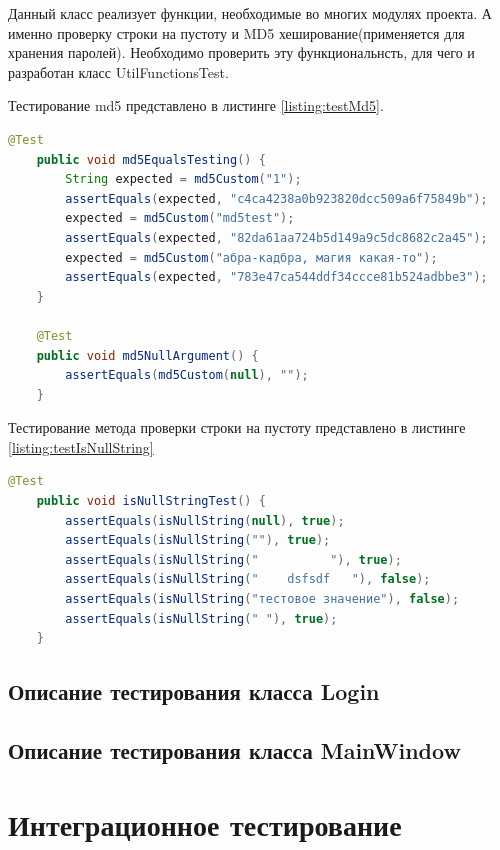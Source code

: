 \documentclass[a4paper,12pt]{article}
\begin{document}
Данный класс реализует функции, необходимые во многих модулях проекта. А именно проверку строки на пустоту и MD5 хеширование(применяется для хранения паролей). Необходимо проверить эту функциональнсть, для чего и разработан класс UtilFunctionsTest.
\par Тестирование md5 представлено в листинге \ref{listing:testMd5}.

\begin{lstlisting}[language=java, caption=тестирование md5 , label=listing:testMd5]
    @Test
    public void md5EqualsTesting() {
        String expected = md5Custom("1");
        assertEquals(expected, "c4ca4238a0b923820dcc509a6f75849b");
        expected = md5Custom("md5test");
        assertEquals(expected, "82da61aa724b5d149a9c5dc8682c2a45");
        expected = md5Custom("абра-кадбра, магия какая-то");
        assertEquals(expected, "783e47ca544ddf34ccce81b524adbbe3");
    }

    @Test
    public void md5NullArgument() {
        assertEquals(md5Custom(null), "");
    }

\end{lstlisting}


Тестирование метода проверки строки на пустоту представлено в листинге \ref{listing:testIsNullString}

\begin{lstlisting}[language=java, caption=тестирование isNullString, label=listing:testIsNullString]
    @Test
    public void isNullStringTest() {
        assertEquals(isNullString(null), true);
        assertEquals(isNullString(""), true);
        assertEquals(isNullString("          "), true);
        assertEquals(isNullString("    dsfsdf   "), false);
        assertEquals(isNullString("тестовое значение"), false);
        assertEquals(isNullString(" "), true);
    }
\end{lstlisting}

\subsection{Описание тестирования класса Login}

\subsection{Описание тестирования класса MainWindow}


\newpage \section{Интеграционное тестирование}
\end{document}
